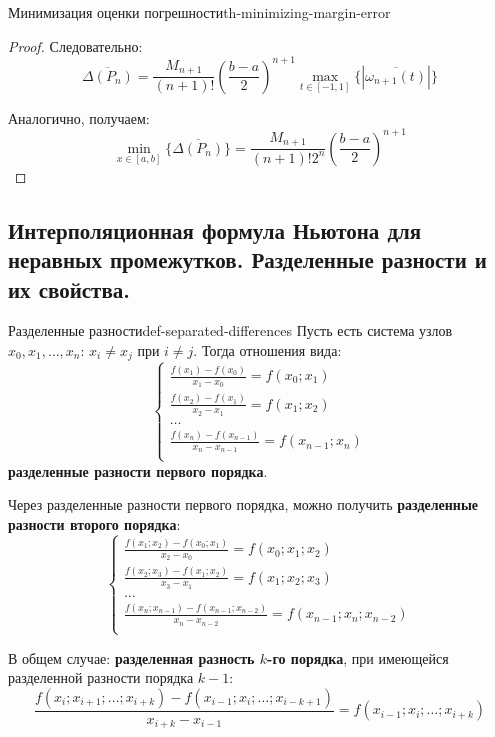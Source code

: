 \documentclass[14pt]{extarticle}
\begin{document}
\begin{theorem}{Минимизация оценки погрешности}{th-minimizing-margin-error}
\begin{proof}
            Следовательно:
            $$\overline{\Delta(P_{n})} = \frac{M_{n + 1}}{(n + 1)!}(\frac{b - a}{2})^{n + 1} \max_{t \in [-1, 1]}\{|\overline{\omega_{n+1}(t)}|\}$$

            Аналогично, получаем:
            $$\min_{x \in [a, b]} \{\overline{\Delta(P_{n})}\} = \frac{M_{n + 1}}{(n+1)!2^{n}}(\frac{b-a}{2})^{n + 1}$$

        \end{proof}
    \end{theorem}


\clearpage
\subsection{Интерполяционная формула Ньютона для неравных промежутков. Разделенные разности и их свойства.}

    \begin{definition}{Разделенные разности}{def-separated-differences}
        Пусть есть система узлов $x_{0}, x_{1}, \ldots, x_{n}$: $x_{i} \neq x_{j}$ при $i \neq j$. Тогда отношения вида:
        $$
        \begin{cases}
            \frac{f(x_{1}) - f(x_{0})}{x_{1} - x_{0}} = f(x_{0}; x_{1})\\
            \frac{f(x_{2}) - f(x_{1})}{x_{2} - x_{1}} = f(x_{1}; x_{2})\\
            \ldots\\
            \frac{f(x_{n}) - f(x_{n-1})}{x_{n} - x_{n-1}} = f(x_{n-1}; x_{n})\\
        \end{cases}
        $$
        \textbf{разделенные разности первого порядка}.

        \vspace{\baselineskip}
    
        Через разделенные разности первого порядка, можно получить \textbf{разделенные разности второго порядка}:
        $$
        \begin{cases}
            \frac{f(x_{1}; x_{2}) - f(x_{0}; x_{1})}{x_{2} - x_{0}} = f(x_{0}; x_{1}; x_{2})\\
            \frac{f(x_{2}; x_{3}) - f(x_{1}; x_{2})}{x_{3} - x_{1}} = f(x_{1}; x_{2}; x_{3})\\
            \ldots\\
            \frac{f(x_{n}; x_{n-1}) - f(x_{n-1}; x_{n-2})}{x_{n} - x_{n-2}} = f(x_{n-1}; x_{n}; x_{n-2})\\
        \end{cases}
        $$

        \vspace{\baselineskip}

        В общем случае: \textbf{разделенная разность $k$-го порядка}, при имеющейся разделенной разности порядка $k-1$:
        $$\frac{f(x_{i}; x_{i + 1}; \ldots; x_{i + k}) - f(x_{i-1}; x_{i}; \ldots; x_{i - k + 1})}{x_{i+k} - x_{i-1}} = f(x_{i-1}; x_{i}; \ldots; x_{i+k})$$
    \end{definition}
\end{document}

